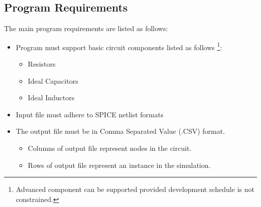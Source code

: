 \documentclass[12pt,a4paper]{article}
\begin{document}
	\subsection{Program Requirements}
	The main program requirements are listed as follows:
	\begin{itemize}
		\item Program must support basic circuit components listed as follows \footnote{Advanced component can be supported
		provided development schedule is not constrained.}:
		\begin{itemize}
			\item Resistors
			\item Ideal Capacitors
			\item Ideal Inductors
		\end{itemize}
		\item Input file must adhere to SPICE netlist formats
		\item The output file must be in Comma Separated Value (.CSV) format.
		\begin{itemize}
			\item Columns of output file represent nodes in the circuit.
			\item Rows of output file represent an instance in the simulation.
		\end{itemize}
	\end{itemize}
	\vfill
	\pagebreak
\end{document}
